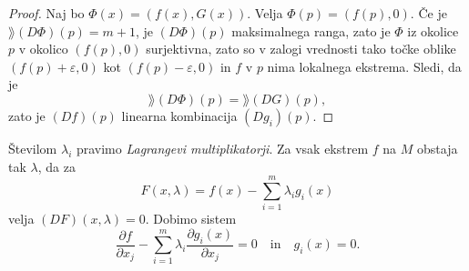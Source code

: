 \begin{proof}
Naj bo $\Phi(x) = (f(x), G(x))$. Velja $\Phi(p) = (f(p),0)$. Če je
$\rang(D\Phi)(p) = m+1$, je $(D\Phi)(p)$ maksimalnega ranga, zato
je $\Phi$ iz okolice $p$ v okolico $(f(p),0)$ surjektivna, zato so
v zalogi vrednosti tako točke oblike $(f(p)+\varepsilon,0)$ kot
$(f(p)-\varepsilon,0)$ in $f$ v $p$ nima lokalnega ekstrema. Sledi,
da je
\[
\rang(D\Phi)(p) = \rang(DG)(p),
\]
zato je $(Df)(p)$ linearna kombinacija $(Dg_i)(p)$.
\end{proof}

\begin{opomba}
Številom $\lambda_i$ pravimo \emph{Lagrangevi multiplikatorji}.
Za vsak ekstrem $f$ na $M$ obstaja tak $\lambda$, da za
\[
F(x, \lambda) = f(x) - \sum_{i = 1}^m \lambda_i g_i(x)
\]
velja $(DF)(x,\lambda) = 0$. Dobimo sistem
\[
\frac{\partial f}{\partial x_j} -
\sum_{i=1}^m \lambda_i \frac{\partial g_i(x)}{\partial x_j} = 0
\quad \text{in} \quad
g_i(x) = 0.
\]
\end{opomba}
